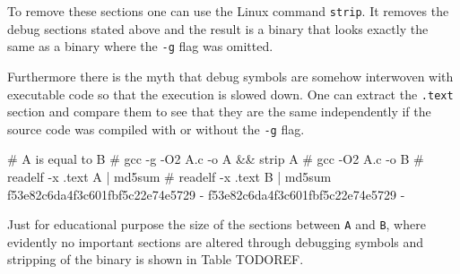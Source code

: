 To remove these sections one can use the Linux command {\tt strip}. It
removes the debug sections stated above and the result is a binary
that looks exactly the same as a binary where the {\tt -g} flag was
omitted.

Furthermore there is the myth that debug symbols are somehow
interwoven with executable code so that the execution is slowed
down. One can extract the {\tt .text} section and compare them to
see that they are the same independently if the source code
was compiled with or without the {\tt -g} flag.

\starttyping
# A is equal to B
# gcc -g -O2 A.c -o A && strip A
# gcc    -O2 A.c -o B
# readelf -x .text A | md5sum
# readelf -x .text B | md5sum
f53e82c6da4f3c601fbf5c22e74e5729  -
f53e82c6da4f3c601fbf5c22e74e5729  -
\stoptyping

Just for educational purpose the size of the sections between {\tt A} and
{\tt B}, where evidently no important sections are altered through
debugging symbols and stripping of the binary is shown in Table
TODOREF.


